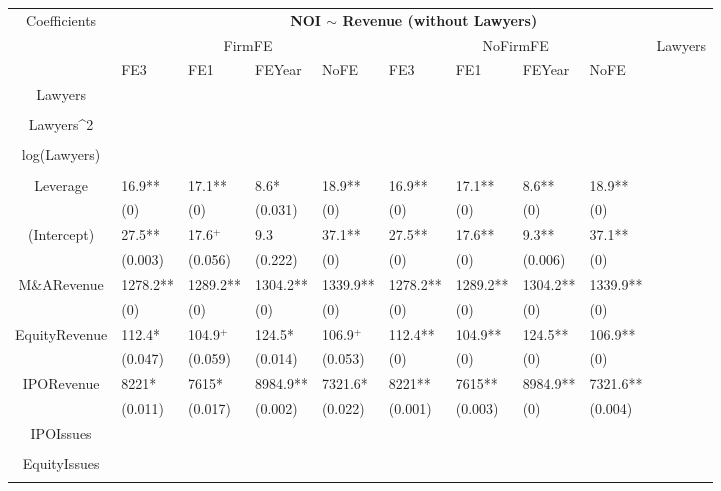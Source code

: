 \documentclass{article}
\begin{document}
\begin{table}[H]
\centering
\begin{tabular}{|clllllllll|}
\hline
\multirow{3}{*}{Coefficients} & \multicolumn{9}{c|}{\textbf{NOI $\sim$ Revenue (without Lawyers)}} \\
\cline{2-10}
& \multicolumn{4}{c}{FirmFE} & \multicolumn{4}{c}{NoFirmFE} & \multirow{2}{*}{Lawyers} \\
\cline{2-9}
& FE3 & FE1 & FEYear & NoFE & FE3 & FE1 & FEYear & NoFE &  \\
\hline
 
Lawyers &  &  &  &  &  &  &  &  & \\ 
   &  &  &  &  &  &  &  &  & \\ 
  Lawyers^2 &  &  &  &  &  &  &  &  & \\ 
   &  &  &  &  &  &  &  &  & \\ 
  log(Lawyers) &  &  &  &  &  &  &  &  & \\ 
   &  &  &  &  &  &  &  &  & \\ 
  Leverage & 16.9** & 17.1** & 8.6* & 18.9** & 16.9** & 17.1** & 8.6** & 18.9** & \\ 
   & (0) & (0) & (0.031) & (0) & (0) & (0) & (0) & (0) & \\ 
  (Intercept) & 27.5** & 17.6$^{+}$ & 9.3 & 37.1** & 27.5** & 17.6** & 9.3** & 37.1** & \\ 
   & (0.003) & (0.056) & (0.222) & (0) & (0) & (0) & (0.006) & (0) & \\ 
  M\&ARevenue & 1278.2** & 1289.2** & 1304.2** & 1339.9** & 1278.2** & 1289.2** & 1304.2** & 1339.9** & \\ 
   & (0) & (0) & (0) & (0) & (0) & (0) & (0) & (0) & \\ 
  EquityRevenue & 112.4* & 104.9$^{+}$ & 124.5* & 106.9$^{+}$ & 112.4** & 104.9** & 124.5** & 106.9** & \\ 
   & (0.047) & (0.059) & (0.014) & (0.053) & (0) & (0) & (0) & (0) & \\ 
  IPORevenue & 8221* & 7615* & 8984.9** & 7321.6* & 8221** & 7615** & 8984.9** & 7321.6** & \\ 
   & (0.011) & (0.017) & (0.002) & (0.022) & (0.001) & (0.003) & (0) & (0.004) & \\ 
  IPOIssues &  &  &  &  &  &  &  &  & \\ 
   &  &  &  &  &  &  &  &  & \\ 
  EquityIssues &  &  &  &  &  &  &  &  & \\ 
   &  &  &  &  &  &  &  &  & \\ 

\end{tabular}
\end{table}
\end{document}
